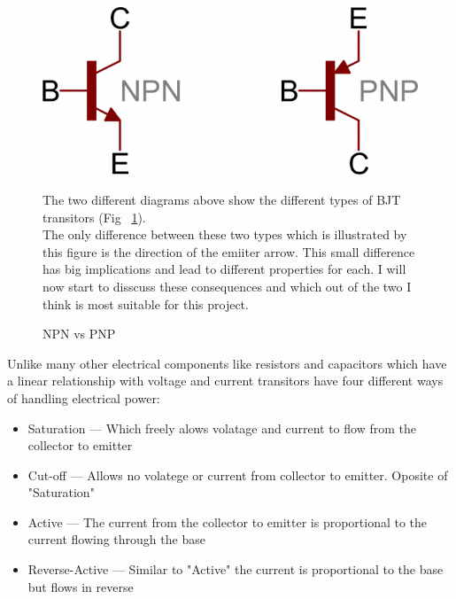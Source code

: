 \documentclass{article}
\begin{document}
\begin{figure}
    \includegraphics{pictures/npn-pnp-symbols.png}
    \caption{NPN vs PNP} \label{fig:different-transitor-layout}
    \vspace{0.5cm}

    The two different diagrams above show the different types of BJT transitors
    (Fig ~\ref{fig:different-transitor-layout}). \\

    The only difference between these two types which is illustrated by this figure is the direction of the 
    emiiter arrow. This small difference has big implications and lead to different properties for each. I
    will now start to disscuss these consequences and which out of the two I think is most suitable for this
    project.

\end{figure}

\break 

Unlike many other electrical components like resistors and capacitors which have a linear relationship with 
voltage and current transitors have four different ways of handling electrical power:

\begin{itemize}
    \item Saturation     --- Which freely alows volatage and current to flow from the collector to emitter
    \item Cut-off        --- Allows no volatege or current from collector to emitter. Oposite of "Saturation"
    \item Active         --- The current from the collector to emitter is proportional to the current flowing
        through the base
    \item Reverse-Active --- Similar to "Active" the current is proportional to the base but flows in reverse
\end{itemize}
\end{document}
